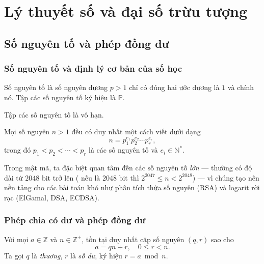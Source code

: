 \documentclass[../DoAn.tex]{subfiles}
\begin{document}
\section{Lý thuyết số và đại số trừu tượng}
\label{sec:number-theory}

\subsection{Số nguyên tố và phép đồng dư}
\label{subsec:primes-modular}

\subsubsection{Số nguyên tố và định lý cơ bản của số học}

\begin{definition}[Số nguyên tố]
Số nguyên tố là số nguyên dương $p > 1$ chỉ có đúng hai ước dương là $1$ và chính nó. Tập các số nguyên tố ký hiệu là $\mathbb{P}$.
\end{definition}

\begin{theorem}[Euclid]
Tập các số nguyên tố là vô hạn.
\end{theorem}

\begin{theorem}
Mọi số nguyên $n > 1$ đều có duy nhất một cách viết dưới dạng
\[
	n = p_1^{e_1} p_2^{e_2} \cdots p_r^{e_r},
\]
trong đó $p_1 < p_2 < \cdots < p_r$ là các số nguyên tố và $e_i \in \mathbb{N}^*$.
\end{theorem}

Trong mật mã, ta đặc biệt quan tâm đến các số nguyên tố \emph{lớn} --- thường có độ dài từ $2048$ bit trở lên ( nếu là $2048$ bit thì $2^{2047} \leq  n < 2^{2048}$) --- vì chúng tạo nên nền tảng cho các bài toán khó như phân tích thừa số nguyên (RSA) và logarit rời rạc (ElGamal, DSA, ECDSA).

\subsubsection{Phép chia có dư và phép đồng dư}

\begin{theorem}
Với mọi $a \in \mathbb{Z}$ và $n \in \mathbb{Z}^+$, tồn tại duy nhất cặp số nguyên $(q, r)$ sao cho
\[
	a = qn + r, \quad 0 \leq r < n.
\]
Ta gọi $q$ là \emph{thương}, $r$ là \emph{số dư}, ký hiệu $r = a \bmod n$.
\end{theorem}
\end{document}
